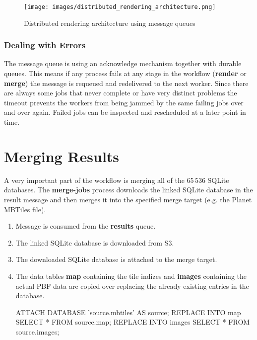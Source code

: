 \begin{figure}[H]
  \centering
  \texttt{[image: images/distributed\_rendering\_architecture.png]}
  \caption{Distributed rendering architecture using message queues}
  \label{distributed_rendering_architecture}
\end{figure}

\subsubsection*{Dealing with Errors}

The message queue is using an acknowledge mechanism together with durable queues.
This means if any process fails at any stage in the workflow (\textbf{render} or \textbf{merge}) the message is requeued and redelivered to the next worker.
Since there are always some jobs that never complete or have very distinct problems the timeout prevents the workers from being jammed by the same failing jobs over and over again.
Failed jobs can be inspected and rescheduled at a later point in time.

\section{Merging Results}

A very important part of the workflow is merging all of the $65\,536$ SQLite databases.
The \textbf{merge-jobs} process downloads the linked SQLite database in the result message
and then merges it into the specified merge target (e.g. the Planet MBTiles file).

\begin{enumerate}  
    \item Message is consumed from the \textbf{results} queue.
    \item The linked SQLite database is downloaded from S3.
    \item The downloaded SQLite database is attached to the merge target.
    \item  The data tables \textbf{map} containing the tile indizes and \textbf{images} containing the actual PBF data are copied over replacing the already existing entries in the database.
    
\begin{sqlcode}
ATTACH DATABASE 'source.mbtiles' AS source;
REPLACE INTO map SELECT * FROM source.map;
REPLACE INTO images SELECT * FROM source.images;
\end{sqlcode}
    
\end{enumerate}

